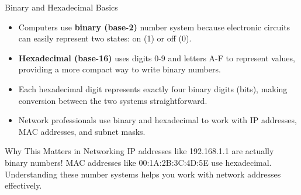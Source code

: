 \documentclass[aspectratio=169]{beamer}
\begin{document}
\begin{frame}{Binary and Hexadecimal Basics}

\begin{itemize}
    \item Computers use \textbf{binary (base-2)} number system because electronic circuits can easily represent two states: on (1) or off (0).
    \item \textbf{Hexadecimal (base-16)} uses digits 0-9 and letters A-F to represent values, providing a more compact way to write binary numbers.
    \item Each hexadecimal digit represents exactly four binary digits (bits), making conversion between the two systems straightforward.
    \item Network professionals use binary and hexadecimal to work with IP addresses, MAC addresses, and subnet masks.
\end{itemize}

\vspace{0.3cm}

\begin{block}{Why This Matters in Networking}
IP addresses like 192.168.1.1 are actually binary numbers! MAC addresses like 00:1A:2B:3C:4D:5E use hexadecimal. Understanding these number systems helps you work with network addresses effectively.
\end{block}

\end{frame}
\end{document}
